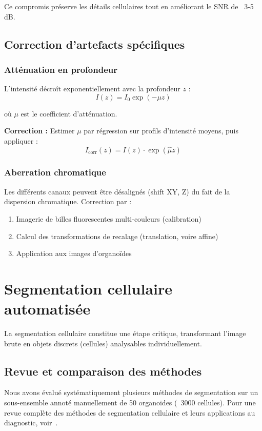 Ce compromis préserve les détails cellulaires tout en améliorant le SNR de ~3-5 dB.

\subsection{Correction d'artefacts spécifiques}

\subsubsection{Atténuation en profondeur}

L'intensité décroît exponentiellement avec la profondeur $z$ :
\[
I(z) = I_0 \exp(-\mu z)
\]

où $\mu$ est le coefficient d'atténuation.

\textbf{Correction :}
Estimer $\mu$ par régression sur profils d'intensité moyens, puis appliquer :
\[
I_{\text{corr}}(z) = I(z) \cdot \exp(\hat{\mu} z)
\]

\subsubsection{Aberration chromatique}

Les différents canaux peuvent être désalignés (shift XY, Z) du fait de la dispersion chromatique. Correction par :
\begin{enumerate}
    \item Imagerie de billes fluorescentes multi-couleurs (calibration)
    \item Calcul des transformations de recalage (translation, voire affine)
    \item Application aux images d'organoïdes
\end{enumerate}

\section{Segmentation cellulaire automatisée}

La segmentation cellulaire constitue une étape critique, transformant l'image brute en objets discrets (cellules) analysables individuellement.

\subsection{Revue et comparaison des méthodes}

Nous avons évalué systématiquement plusieurs méthodes de segmentation sur un sous-ensemble annoté manuellement de 50 organoïdes (~3000 cellules). Pour une revue complète des méthodes de segmentation cellulaire et leurs applications au diagnostic, voir~\cite{Nunes2024,Rayed2024,Wang2022Segmentation}.

